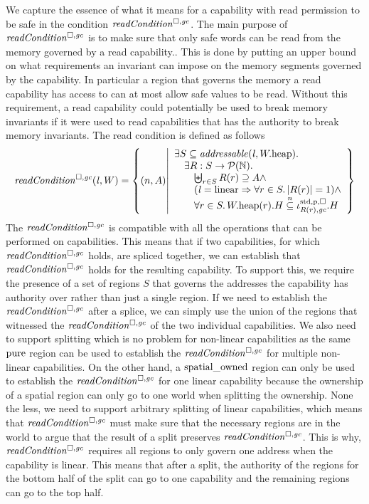 \begin{jversion}
We capture the essence of what it means for a capability with read permission to be safe in the condition $\readCond{}$.
The main purpose of $\readCond{}$ is to make sure that only safe words can be read from the memory governed by a read capability..
This is done by putting an upper bound on what requirements an invariant can impose on the memory segments governed by the capability.
In particular a region that governs the memory a read capability has access to can at most allow safe values to be read.
Without this requirement, a read capability could potentially be used to break memory invariants if it were used to read capabilities that has the authority to break memory invariants.
The read condition is defined as follows
\[
  \readCond{\lin,W} = \left\{ \npair{A} \middle| 
    \begin{array}{l}
      \exists S \subseteq \addressable{\lin, \pwheap} \ldotp \\
      \quad \exists R : S \fun \powerset{\nats} \ldotp\\
      \qquad \biguplus_{r\in S} R(r) \supseteq A \wedge\\
      \qquad (\lin = \linear \Rightarrow \forall r \in S \ldotp |R(r)|  = 1) \wedge\\
      \qquad \forall r \in S \ldotp \pwheap(r).H \nsubeq \stdreg{R(r),\gc}{\pur}.H
    \end{array}
  \right\}
\]
The $\readCond{}$ is compatible with all the operations that can be performed on capabilities.
This means that if two capabilities, for which $\readCond{}$ holds, are spliced together, we can establish that $\readCond{}$ holds for the resulting capability.
To support this, we require the presence of a set of regions $S$ that governs the addresses the capability has authority over rather than just a single region.
If we need to establish the $\readCond{}$ after a splice, we can simply use the union of the regions that witnessed the $\readCond{}$ of the two individual capabilities.
We also need to support splitting which is no problem for non-linear capabilities as the same $\mathrm{pure}$ region can be used to establish the $\readCond{}$ for multiple non-linear capabilities.
On the other hand, a $\mathrm{spatial\_owned}$ region can only be used to establish the $\readCond{}$ for one linear capability because the ownership of a spatial region can only go to one world when splitting the ownership.
None the less, we need to support arbitrary splitting of linear capabilities, which means that $\readCond{}$ must make sure that the necessary regions are in the world to argue that the result of a split preserves $\readCond{}$.
This is why, $\readCond{}$ requires all regions to only govern one address when the capability is linear.
This means that after a split, the authority of the regions for the bottom half of the split can go to one capability and the remaining regions can go to the top half.


\end{jversion}

